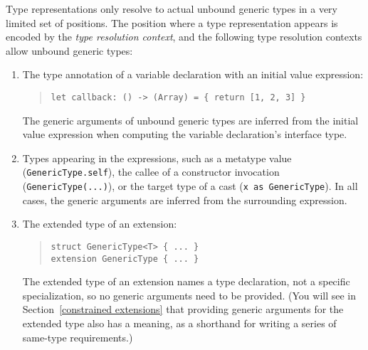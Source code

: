 \documentclass[../generics]{subfiles}
\begin{document}
Type representations only resolve to actual unbound generic types in a very limited set of positions. The position where a type representation appears is encoded by the \emph{type resolution context}, and the following type resolution contexts allow unbound generic types:
\begin{enumerate}

\item The type annotation of a variable declaration with an initial value expression:
\begin{quote}
\begin{verbatim}
let callback: () -> (Array) = { return [1, 2, 3] }
\end{verbatim}
\end{quote}
The generic arguments of unbound generic types are inferred from the initial value expression when computing the variable declaration's interface type.

\item Types appearing in the expressions, such as a metatype value (\texttt{GenericType.self}), the callee of a constructor invocation (\texttt{GenericType(...)}), or the target type of a cast (\texttt{x as GenericType}). In all cases, the generic arguments are inferred from the surrounding expression.

\item The extended type of an extension:
\begin{quote}
\begin{verbatim}
struct GenericType<T> { ... }
extension GenericType { ... }
\end{verbatim}
\end{quote}
The extended type of an extension names a type declaration, not a specific specialization, so no generic arguments need to be provided. (You will see in Section~\ref{constrained extensions} that providing generic arguments for the extended type also has a meaning, as a shorthand for writing a series of same-type requirements.)


\end{enumerate}
\end{document}
